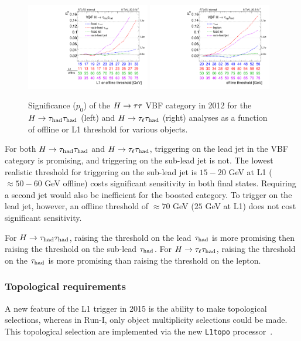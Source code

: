 \begin{figure}[tp]
  \centering
  \includegraphics[width=0.48\textwidth]{figures/trigger/evolution_hadhad}
  \includegraphics[width=0.48\textwidth]{figures/trigger/evolution_lephad}
  \caption{Significance ($p_0$) of the $H\rightarrow\tau\tau$ VBF category in 2012 for the $H\rightarrow\tau_\text{had}\tau_\text{had}$ (left) and $H\rightarrow\tau_\ell\tau_\text{had}$ (right) analyses as a function of offline or L1 threshold for various objects.}
  \label{fig:prospects-trigger-evolution}
\end{figure}

For both $H\rightarrow\tau_\text{had}\tau_\text{had}$ and $H\rightarrow\tau_\ell\tau_\text{had}$, triggering on the lead jet in the VBF category is promising, and triggering on the sub-lead jet is not. The lowest realistic threshold for triggering on the sub-lead jet is $15-20$ GeV at L1 ($\approx\! 50-60$ GeV offline) costs significant sensitivity in both final states. Requiring a second jet would also be inefficient for the boosted category. To trigger on the lead jet, however, an offline threshold of $\approx\! 70$ GeV ($25$ GeV at L1) does not cost significant sensitivity.

For $H\rightarrow\tau_\text{had}\tau_\text{had}$, raising the threshold on the lead $\tau_\text{had}$ is more promising then raising the threshold on the sub-lead $\tau_\text{had}$. For $H\rightarrow\tau_\ell\tau_\text{had}$, raising the threshold on the $\tau_\text{had}$ is more promising than raising the threshold on the lepton.

\subsubsection{Topological requirements}

A new feature of the L1 trigger in 2015 is the ability to make topological selections, whereas in Run-I, only object multiplicity selections could be made. This topological selection are implemented via the new \texttt{L1topo} processor~\cite{ATL-DAQ-PROC-2013-039,ATL-COM-DAQ-2014-005}.

